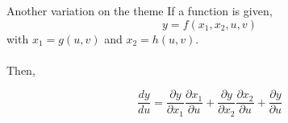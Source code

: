 \documentclass{./../../Latex/teaching_slides}
\begin{document}
\begin{frame}{Another variation on the theme}
If a function is given,
$$
y=f\left(x_{1}, x_{2}, u, v\right)
$$
with $x_{1}=g(u, v)$ and $x_{2}=h(u, v)$. \\~\\

Then,

\[\frac{d y}{d u}=\frac{\partial y}{\partial x_{1}} \frac{\partial x_{1}}{\partial u}+\frac{\partial y}{\partial x_{2}} \frac{\partial x_{2}}{\partial u}+\frac{\partial y}{\partial u}\]
\end{frame}

%
%
%
%
%
%
%
\end{document}
